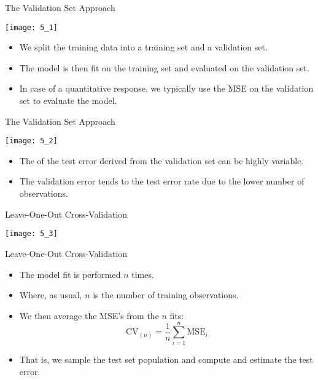 \documentclass[mathserif, aspectratio=169]{beamer}
\begin{document}
\begin{frame}{The Validation Set Approach}
	\begin{center}
		\texttt{[image: 5\_1]}
	\end{center}
	\begin{itemize}
		\item We  split the training data into a training set and
			a validation set.
		\item The model is then fit on the training set and evaluated on the
			validation set.
		\item In case of a quantitative response, we typically use the MSE on 
			the validation set to evaluate the model.
	\end{itemize}
\end{frame}

\begin{frame}{The Validation Set Approach}
	\vspace{-5mm}
	\begin{center}
		\texttt{[image: 5\_2]}
	\end{center}
	\vspace{-5mm}
	\begin{itemize}
		\item The  of the test error derived from the validation 
			set can be highly variable.
		\item The validation error tends to  the test error rate
			due to the lower number of observations.
	\end{itemize}
\end{frame}

\begin{frame}{Leave-One-Out Cross-Validation}
	\begin{center}
		\texttt{[image: 5\_3]}
	\end{center}
\end{frame}

\begin{frame}{Leave-One-Out Cross-Validation}
	\begin{itemize}
		\item The model fit is performed $n$ times.
		\item Where, as usual, $n$ is the number of training observations.
		\item We then average the MSE's from the $n$ fits:
			\[ 
				\text{CV}_{(n)} = 
				\frac{1}{n}\sum_{i=1}^{n} \text{MSE}_i
			\]
		\item That is, we sample the test set population and compute and estimate
			the test error.
	\end{itemize}
\end{frame}
\end{document}
